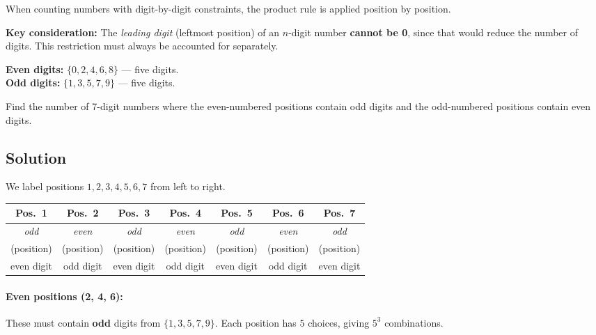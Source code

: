 \documentclass[12pt, a4paper]{article}
\begin{document}
\begin{theorybox}
When counting numbers with digit-by-digit constraints, the product rule
is applied position by position.

\medskip
\textbf{Key consideration:}\;
The \emph{leading digit} (leftmost position) of an $n$-digit number
\textbf{cannot be 0}, since that would reduce the number of digits.
This restriction must always be accounted for separately.

\medskip
\textbf{Even digits:} $\{0, 2, 4, 6, 8\}$ --- five digits.\\
\textbf{Odd digits:} $\{1, 3, 5, 7, 9\}$ --- five digits.
\end{theorybox}

\begin{problembox}
Find the number of 7-digit numbers where the even-numbered positions
contain odd digits and the odd-numbered positions contain even digits.
\end{problembox}

\subsection*{Solution}

We label positions $1, 2, 3, 4, 5, 6, 7$ from left to right.

\begin{center}
\renewcommand{\arraystretch}{1.4}
\begin{tabular}{ccccccc}
\toprule
Pos.\ 1 & Pos.\ 2 & Pos.\ 3 & Pos.\ 4 & Pos.\ 5 & Pos.\ 6 & Pos.\ 7 \\
\midrule
\textit{odd} & \textit{even} & \textit{odd} & \textit{even} & \textit{odd} & \textit{even} & \textit{odd} \\
(position) & (position) & (position) & (position) & (position) & (position) & (position) \\
\midrule
even digit & odd digit & even digit & odd digit & even digit & odd digit & even digit \\
\bottomrule
\end{tabular}
\end{center}

\paragraph{Even positions (2, 4, 6):}
These must contain \textbf{odd} digits from $\{1, 3, 5, 7, 9\}$.
Each position has $5$ choices, giving $5^3$ combinations.
\end{document}
